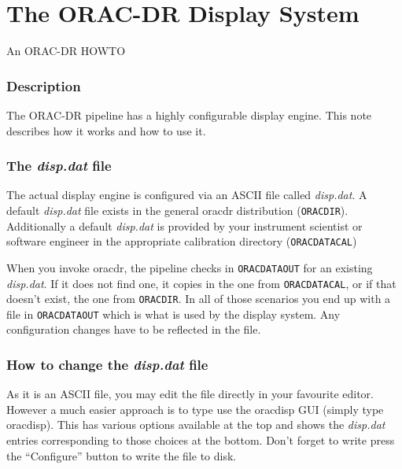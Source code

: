 \documentclass[twoside,11pt]{article}
\renewcommand{\_}{\texttt{\symbol{95}}}
\begin{document}
\section{The ORAC-DR Display System\label{The_ORAC-DR_Display_System}}


An ORAC-DR HOWTO

\subsubsection*{Description\label{The_ORAC-DR_Display_System_Description}}


The ORAC-DR pipeline has a highly configurable display engine. This
note describes how it works and how to use it.

\subsubsection*{The \emph{disp.dat} file\label{The_ORAC-DR_Display_System_The_disp_dat_file}}


The actual display engine is configured via an ASCII file called
\emph{disp.dat}. A default \emph{disp.dat} file exists in the general oracdr
distribution (\texttt{ORAC\_DIR}). Additionally a default \emph{disp.dat} is provided
by your instrument scientist or software engineer in the appropriate
calibration directory (\texttt{ORAC\_DATA\_CAL})



When you invoke oracdr, the pipeline checks in \texttt{ORAC\_DATA\_OUT} for an
existing \emph{disp.dat}. If it does not find one, it copies in the one from
\texttt{ORAC\_DATA\_CAL}, or if that doesn't exist, the one from \texttt{ORAC\_DIR}. In
all of those scenarios you end up with a file in \texttt{ORAC\_DATA\_OUT} which
is what is used by the display system. Any configuration changes have
to be reflected in the file.

\subsubsection*{How to change the \emph{disp.dat} file\label{The_ORAC-DR_Display_System_How_to_change_the_disp_dat_file}}


As it is an ASCII file, you may edit the file directly in your
favourite editor. However a much easier approach is to type use the
oracdisp GUI (simply type oracdisp). This has various options
available at the top and shows the \emph{disp.dat} entries corresponding to
those choices at the bottom. Don't forget to write press the
``Configure'' button to write the file to disk.
\end{document}
